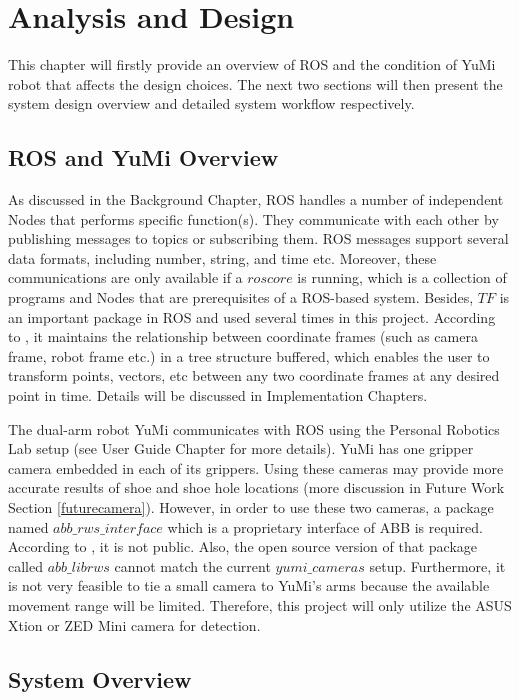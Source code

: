 \chapter{Analysis and Design}

This chapter will firstly provide an overview of ROS and the condition of YuMi robot that affects the design choices. The next two sections will then present the system design overview and detailed system workflow respectively.

\section{ROS and YuMi Overview}
As discussed in the Background Chapter, ROS handles a number of independent Nodes that performs specific function(s). They communicate with each other by publishing messages to topics or subscribing them. ROS messages support several data formats, including number, string, and time etc. Moreover, these communications are only available if a $roscore$ is running, which is a collection of programs and Nodes that are prerequisites of a ROS-based system. Besides, $TF$ is an important package in ROS and used several times in this project. According to \citep{tfROSWik}, it maintains the relationship between coordinate frames (such as camera frame, robot frame etc.) in a tree structure buffered, which enables the user to transform points, vectors, etc between any two coordinate frames at any desired point in time. Details will be discussed in Implementation Chapters.

The dual-arm robot YuMi communicates with ROS using the Personal Robotics Lab setup (see User Guide Chapter for more details). YuMi has one gripper camera embedded in each of its grippers. Using these cameras may provide more accurate results of shoe and shoe hole locations (more discussion in Future Work Section \ref{futurecamera}). However, in order to use these two cameras, a package named $abb\_rws\_interface$ which is a proprietary interface of ABB is required. According to \citep{EGMfiles}, it is not public. Also, the open source version of that package called $abb\_librws$ cannot match the current $yumi\_cameras$ setup. Furthermore, it is not very feasible to tie a small camera to YuMi's arms because the available movement range will be limited. Therefore, this project will only utilize the ASUS Xtion or ZED Mini camera for detection.

\section{System Overview}

